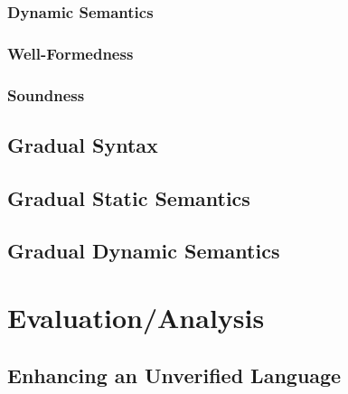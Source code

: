     \subsection{Dynamic Semantics}
    \label{ssec:dynamic-semantics}
    
    
    \subsection{Well-Formedness}
    \label{sec:well-formedness}
    
    
    \subsection{Soundness}
    \label{ssec:soundness}
    

\section{Gradual Syntax}
\label{sec:cs-gradual-formulas}


%

\section{Gradual Static Semantics}
\label{sec:gradualize-hoare-rules}


\section{Gradual Dynamic Semantics}
\label{sec:gradual-dyn--semantics}





\chapter{Evaluation/Analysis}
\label{ch:evaluation-analysis}


\section{Enhancing an Unverified Language}
\label{sec:enhancing-an-unverified}



